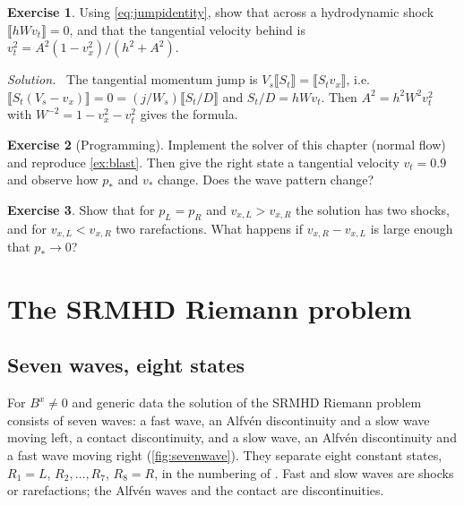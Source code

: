 \documentclass[11pt,a4paper,oneside,openany]{book}
\newcommand{\textcite}{\citet}
\theoremstyle{definition}
\newtheorem{exercise}{Exercise}[chapter]
\theoremstyle{plain}
\theoremstyle{remark}
\newenvironment{solution}{\par\smallskip\noindent\small\textit{Solution.}\ }{\par\medskip}
\newcommand{\jump}[1]{\llbracket #1\rrbracket}
\begin{document}
\begin{exercise}\label{ex:Ashock}
Using \eqref{eq:jumpidentity}, show that across a hydrodynamic shock
$\jump{hWv_t}=0$, and that the tangential velocity behind is
$v_t^2=A^2(1-v_x^2)/(h^2+A^2)$.
\end{exercise}
\begin{solution}
The tangential momentum jump is $V_s\jump{S_t}=\jump{S_tv_x}$, i.e.\
$\jump{S_t(V_s-v_x)}=0=(j/W_s)\jump{S_t/D}$ and $S_t/D=hWv_t$. Then $A^2=h^2W^2v_t^2$ with
$W^{-2}=1-v_x^2-v_t^2$ gives the formula.
\end{solution}

\begin{exercise}[Programming]
Implement the solver of this chapter (normal flow) and reproduce \cref{ex:blast}. Then
give the right state a tangential velocity $v_t=0.9$ and observe how $p_\ast$ and $v_\ast$
change. Does the wave pattern change?
\end{exercise}

\begin{exercise}
Show that for $p_L=p_R$ and $v_{x,L}>v_{x,R}$ the solution has two shocks, and for
$v_{x,L}<v_{x,R}$ two rarefactions. What happens if $v_{x,R}-v_{x,L}$ is large enough that
$p_\ast\to0$?
\end{exercise}


\chapter{The SRMHD Riemann problem}\label{ch:srmhd}

\section{Seven waves, eight states}

For $B^x\ne0$ and generic data the solution of the SRMHD Riemann problem consists of seven
waves: a fast wave, an Alfvén discontinuity and a slow wave moving left, a contact
discontinuity, and a slow wave, an Alfvén discontinuity and a fast wave moving right
(\cref{fig:sevenwave}). They separate eight constant states, $R_1=L$, $R_2,\dots,R_7$,
$R_8=R$, in the numbering of \textcite{GiacomazzoRezzolla2006}. Fast and slow waves are
shocks or rarefactions; the Alfvén waves and the contact are discontinuities.
\end{document}

